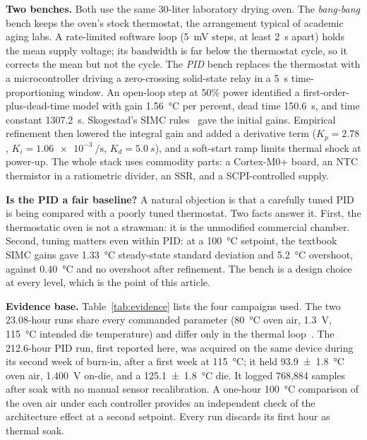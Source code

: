 \documentclass[10pt,twocolumn]{article}
\begin{document}
\textbf{Two benches.} Both use the same 30-liter laboratory drying oven. The \emph{bang-bang} bench keeps the oven's stock thermostat, the arrangement typical of academic aging labs. A rate-limited software loop (\SI{5}{mV} steps, at least \SI{2}{s} apart) holds the mean supply voltage; its bandwidth is far below the thermostat cycle, so it corrects the mean but not the cycle. The \emph{PID} bench replaces the thermostat with a microcontroller driving a zero-crossing solid-state relay in a \SI{5}{s} time-proportioning window. An open-loop step at 50\% power identified a first-order-plus-dead-time model with gain \SI{1.56}{\celsius} per percent, dead time \SI{150.6}{s}, and time constant \SI{1307.2}{s}. Skogestad's SIMC rules~\cite{simc} gave the initial gains. Empirical refinement then lowered the integral gain and added a derivative term ($K_p=2.78$, $K_i=\SI{1.06e-3}{\per\s}$, $K_d=\SI{5.0}{s}$), and a soft-start ramp limits thermal shock at power-up. The whole stack uses commodity parts: a Cortex-M0+ board, an NTC thermistor in a ratiometric divider, an SSR, and a SCPI-controlled supply.

\textbf{Is the PID a fair baseline?} A natural objection is that a carefully tuned PID is being compared with a poorly tuned thermostat. Two facts answer it. First, the thermostatic oven is not a strawman: it is the unmodified commercial chamber. Second, tuning matters even within PID: at a \SI{100}{\celsius} setpoint, the textbook SIMC gains gave \SI{1.33}{\celsius} steady-state standard deviation and \SI{5.2}{\celsius} overshoot, against \SI{0.40}{\celsius} and no overshoot after refinement. The bench is a design choice at every level, which is the point of this article.

\textbf{Evidence base.} Table~\ref{tab:evidence} lists the four campaigns used. The two 23.08-hour runs share every commanded parameter (\SI{80}{\celsius} oven air, \SI{1.3}{V}, \SI{115}{\celsius} intended die temperature) and differ only in the thermal loop~\cite{sbcci26}. The 212.6-hour PID run, first reported here, was acquired on the same device during its second week of burn-in, after a first week at \SI{115}{\celsius}; it held \SI{93.9 \pm 1.8}{\celsius} oven air, \SI{1.400}{V} on-die, and a \SI{125.1 \pm 1.8}{\celsius} die. It logged 768,884 samples after soak with no manual sensor recalibration. A one-hour \SI{100}{\celsius} comparison of the oven air under each controller provides an independent check of the architecture effect at a second setpoint. Every run discards its first hour as thermal soak.
\end{document}
